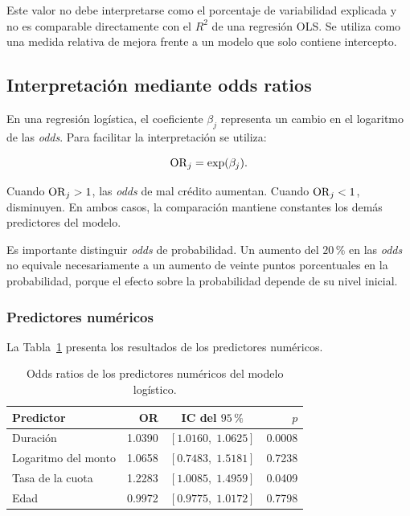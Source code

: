 Este valor no debe interpretarse como el porcentaje de variabilidad
explicada y no es comparable directamente con el \(R^2\) de una
regresión OLS. Se utiliza como una medida relativa de mejora frente a un
modelo que solo contiene intercepto.

\subsection{Interpretación mediante odds ratios}

En una regresión logística, el coeficiente \(\beta_j\) representa un
cambio en el logaritmo de las \textit{odds}. Para facilitar la
interpretación se utiliza:

\[
\mathrm{OR}_j
=
\exp(\beta_j).
\]

Cuando \(\mathrm{OR}_j>1\), las \textit{odds} de mal crédito aumentan. Cuando
\(\mathrm{OR}_j<1\), disminuyen. En ambos casos, la comparación mantiene
constantes los demás predictores del modelo.

Es importante distinguir \textit{odds} de probabilidad. Un aumento del
\(20\,\%\) en las \textit{odds} no equivale necesariamente a un aumento
de veinte puntos porcentuales en la probabilidad, porque el efecto sobre
la probabilidad depende de su nivel inicial.

\subsubsection{Predictores numéricos}

La Tabla~\ref{tab:or-numericos} presenta los resultados de los
predictores numéricos.

\begin{table}[H]
    \centering
    \caption{Odds ratios de los predictores numéricos del modelo
    logístico.}
    \label{tab:or-numericos}

    \begin{tabular}{
        @{}
        l
        r
        c
        r
        @{}
    }
        \toprule
        Predictor
        & OR
        & IC del \(95\,\%\)
        & \(p\) \\
        \midrule

        Duración
        & \num{1.0390}
        & \([1.0160,\;1.0625]\)
        & \num{0.0008} \\

        Logaritmo del monto
        & \num{1.0658}
        & \([0.7483,\;1.5181]\)
        & \num{0.7238} \\

        Tasa de la cuota
        & \num{1.2283}
        & \([1.0085,\;1.4959]\)
        & \num{0.0409} \\

        Edad
        & \num{0.9972}
        & \([0.9775,\;1.0172]\)
        & \num{0.7798} \\

        \bottomrule
    \end{tabular}
\end{table}

